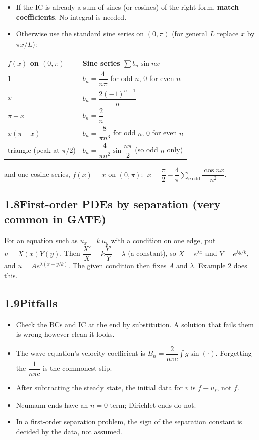 \documentclass[11pt]{article}
\begin{document}
\begin{itemize}
  \item If the IC is already a sum of sines (or cosines) of the right form, \textbf{match coefficients}. No integral is needed.
  \item Otherwise use the standard sine series on $(0,\pi)$ (for general $L$ replace $x$ by $\pi x/L$):
\end{itemize}

\begin{center}
\renewcommand{\arraystretch}{1.5}
\begin{tabular}{|l|l|}
\hline
\textbf{$f(x)$ on $(0,\pi)$} & \textbf{Sine series $\sum b_n\sin nx$}\\
\hline
$1$ & $b_n=\dfrac{4}{n\pi}$ for odd $n$, $0$ for even $n$\\
$x$ & $b_n=\dfrac{2(-1)^{n+1}}{n}$\\
$\pi-x$ & $b_n=\dfrac2n$\\
$x(\pi-x)$ & $b_n=\dfrac{8}{\pi n^3}$ for odd $n$, $0$ for even $n$\\
triangle (peak at $\pi/2$) & $b_n=\dfrac{4}{\pi n^2}\sin\dfrac{n\pi}{2}$ (so odd $n$ only)\\
\hline
\end{tabular}
\end{center}

and one cosine series, $f(x)=x$ on $(0,\pi)$: $\;x=\dfrac\pi2-\dfrac4\pi\displaystyle\sum_{n\ \mathrm{odd}}\dfrac{\cos nx}{n^2}$.

\subsection*{1.8\quad First-order PDEs by separation (very common in GATE)}

For an equation such as $u_x=k\,u_y$ with a condition on one edge, put $u=X(x)Y(y)$. Then $\dfrac{X'}{X}=k\dfrac{Y'}{Y}=\lambda$ (a constant), so $X=e^{\lambda x}$ and $Y=e^{\lambda y/k}$, and $u=Ae^{\lambda(x+y/k)}$. The given condition then fixes $A$ and $\lambda$. Example 2 does this.

\subsection*{1.9\quad Pitfalls}

\begin{itemize}
  \item Check the BCs and IC at the end by substitution. A solution that fails them is wrong however clean it looks.
  \item The wave equation's velocity coefficient is $B_n=\dfrac{2}{n\pi c}\int g\sin(\cdot)$. Forgetting the $\dfrac{1}{n\pi c}$ is the commonest slip.
  \item After subtracting the steady state, the initial data for $v$ is $f-u_s$, not $f$.
  \item Neumann ends have an $n=0$ term; Dirichlet ends do not.
  \item In a first-order separation problem, the sign of the separation constant is decided by the data, not assumed.
\end{itemize}
\end{document}
